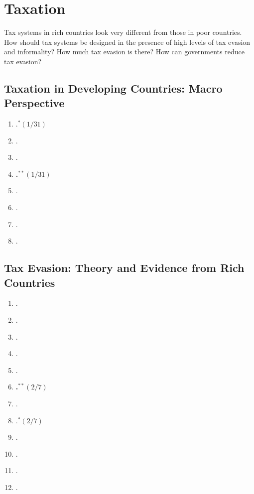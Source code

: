 \documentclass[11pt]{article}
\begin{document}
\section{Taxation}
Tax systems in rich countries look very different from those in poor countries. How should tax systems be designed in the presence of high levels of tax evasion and informality? How much tax evasion is there? How can governments reduce tax evasion?

\subsection{Taxation in Developing Countries: Macro Perspective}

\begin{enumerate}
\item {}.$^{*}(1/31)$
\item {}.
\item {}.
\item \textbf{.$^{**}(1/31)$}
\item {}.
\item {}.
\item {}.
\item {}.
\end{enumerate}

\subsection{Tax Evasion: Theory and Evidence from Rich Countries}

\begin{enumerate}
\item {}.
\item {}.
\item {}.
\item {}.
\item {}.
\item \textbf{.$^{**}(2/7)$}
\item {}.
\item {}.$^{*}(2/7)$
\item {}.
\item {}.
\item {}.
\item {}.
\end{enumerate}
\end{document}
